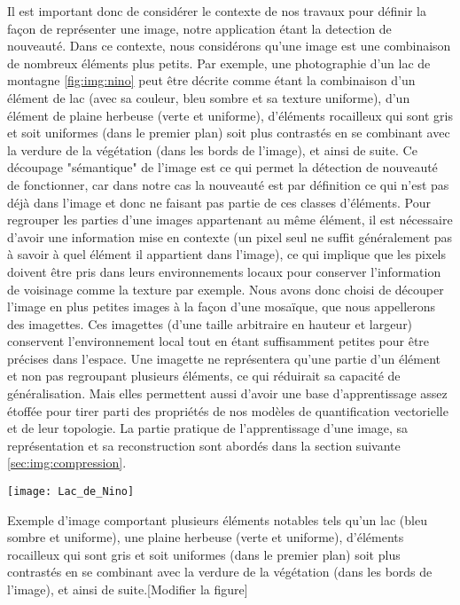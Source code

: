 	Il est important donc de considérer le contexte de nos travaux pour définir la façon de représenter une image, notre application étant la detection de nouveauté. Dans ce contexte, nous considérons qu'une image est une combinaison de nombreux éléments plus petits. Par exemple, une photographie d'un lac de montagne \ref{fig:img:nino} peut être décrite comme étant la combinaison d'un élément de lac (avec sa couleur, bleu sombre et sa texture uniforme), d'un élément de plaine herbeuse (verte et uniforme), d'éléments rocailleux qui sont gris et soit uniformes (dans le premier plan) soit plus contrastés en se combinant avec la verdure de la végétation (dans les bords de l'image), et ainsi de suite. Ce découpage "sémantique" de l'image est ce qui permet la détection de nouveauté  de fonctionner, car dans notre cas la nouveauté est par définition ce qui n'est pas déjà dans l'image et donc ne faisant pas partie de ces classes d'éléments. Pour regrouper les parties d'une images appartenant au même élément, il est nécessaire d'avoir une information mise en contexte (un pixel seul ne suffit généralement pas à savoir à quel élément il appartient dans l'image), ce qui implique que les pixels doivent être pris dans leurs environnements locaux pour conserver l'information de voisinage comme la texture par exemple. Nous avons donc choisi de découper l'image en plus petites images à la façon d'une mosaïque, que nous appellerons des imagettes. Ces imagettes (d'une taille arbitraire en hauteur et largeur) conservent l'environnement local tout en étant suffisamment petites pour être précises dans l'espace. Une imagette ne représentera qu'une partie d'un élément et non pas regroupant plusieurs éléments, ce qui réduirait sa capacité de généralisation. Mais elles permettent aussi d'avoir une base d'apprentissage assez étoffée pour tirer parti des propriétés de nos modèles de quantification vectorielle et de leur topologie. La partie pratique de l'apprentissage d'une image, sa représentation et sa reconstruction sont abordés dans la section suivante \ref{sec:img:compression}.


	\begin{figureth}
		\texttt{[image: Lac\_de\_Nino]}
		\caption[Lac de Nino]{Exemple d'image comportant plusieurs éléments notables tels qu'un lac (bleu sombre et uniforme), une plaine herbeuse (verte et uniforme), d'éléments rocailleux qui sont gris et soit uniformes (dans le premier plan) soit plus contrastés en se combinant avec la verdure de la végétation (dans les bords de l'image), et ainsi de suite.[Modifier la figure]}\label{fig:img:nino}
	\end{figureth}

